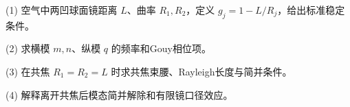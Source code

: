 (1) 空气中两凹球面镜距离 \(L\)、曲率 \(R_1,R_2\)，定义 \(g_j=1-L/R_j\)，给出标准稳定条件。

(2) 求横模 \(m,n\)、纵模 \(q\) 的频率和Gouy相位项。

(3) 在共焦 \(R_1=R_2=L\) 时求共焦束腰、Rayleigh长度与简并条件。

(4) 解释离开共焦后模态简并解除和有限镜口径效应。
